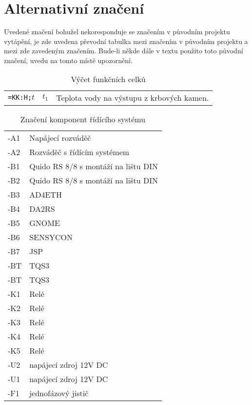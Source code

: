 \documentclass[a4paper,draft]{book}
\begin{document}
\section{Alternativní značení}

    Uvedené značení bohužel nekoresponduje se značením v původním projektu
    vytápění, je zde uvedena převodní tabulka mezi značením v původním
    projektu a mezi zde zavedeným značením. Bude-li někde dále v textu
    použito toto původní značení, uvedu na tomto místě upozornění.

    \begin{table}[]
        \centering
        \begin{tabular}{ l l l}
            \texttt{=KK:H;}$t$\index{$t_1$|see {=KK:H;t}} & $t_1$ & Teplota vody na výstupu z krbových kamen.
        \end{tabular}
        \caption{Výčet funkčních celků}
        \label{tab:myfirsttable}
    \end{table}


\begin{table}[]
  \centering
    \begin{tabular}{l l}
      -A1 & Napájecí rozváděč\\
      -A2 & Rozváděč s řídícím systémem\\
      -B1 & Quido RS 8/8 s montáží na lištu DIN\\
      -B2 & Quido RS 8/8 s montáží na lištu DIN\\
      -B3 & AD4ETH\\
      -B4 & DA2RS\\
      -B5 & GNOME\\
      -B6 & SENSYCON\\
      -B7 & JSP\\
      -BT & TQS3\\
      -BT & TQS3\\
      -K1 & Relé\\
      -K2 & Relé\\
      -K3 & Relé\\
      -K4 & Relé\\
      -K5 & Relé\\
      -U2 & napájecí zdroj 12V DC\\
      -U1 & napájecí zdroj 12V DC\\
      -F1 & jednofázový jistič
    \end{tabular}
  \caption{Značení komponent řídícího systému}
  \label{tab:CSLabels}
\end{table}
\end{document}
